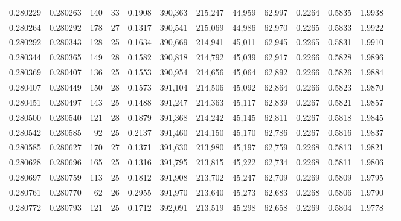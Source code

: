 \begin{tabular}{rrrrrrrrrrrrr}
0.280229 & 0.280263 &   140 &  33 &                                     0.1908 & 390,363 & 215,247 &  44,959 &  62,997 & 0.2264 & 0.5835 & 1.9938 \\
0.280264 & 0.280292 &   178 &  27 &                                     0.1317 & 390,541 & 215,069 &  44,986 &  62,970 & 0.2265 & 0.5833 & 1.9922 \\
0.280292 & 0.280343 &   128 &  25 &                                     0.1634 & 390,669 & 214,941 &  45,011 &  62,945 & 0.2265 & 0.5831 & 1.9910 \\
0.280344 & 0.280365 &   149 &  28 &                                     0.1582 & 390,818 & 214,792 &  45,039 &  62,917 & 0.2266 & 0.5828 & 1.9896 \\
0.280369 & 0.280407 &   136 &  25 &                                     0.1553 & 390,954 & 214,656 &  45,064 &  62,892 & 0.2266 & 0.5826 & 1.9884 \\
0.280407 & 0.280449 &   150 &  28 &                                     0.1573 & 391,104 & 214,506 &  45,092 &  62,864 & 0.2266 & 0.5823 & 1.9870 \\
0.280451 & 0.280497 &   143 &  25 &                                     0.1488 & 391,247 & 214,363 &  45,117 &  62,839 & 0.2267 & 0.5821 & 1.9857 \\
0.280500 & 0.280540 &   121 &  28 &                                     0.1879 & 391,368 & 214,242 &  45,145 &  62,811 & 0.2267 & 0.5818 & 1.9845 \\
0.280542 & 0.280585 &    92 &  25 &                                     0.2137 & 391,460 & 214,150 &  45,170 &  62,786 & 0.2267 & 0.5816 & 1.9837 \\
0.280585 & 0.280627 &   170 &  27 &                                     0.1371 & 391,630 & 213,980 &  45,197 &  62,759 & 0.2268 & 0.5813 & 1.9821 \\
0.280628 & 0.280696 &   165 &  25 &                                     0.1316 & 391,795 & 213,815 &  45,222 &  62,734 & 0.2268 & 0.5811 & 1.9806 \\
0.280697 & 0.280759 &   113 &  25 &                                     0.1812 & 391,908 & 213,702 &  45,247 &  62,709 & 0.2269 & 0.5809 & 1.9795 \\
0.280761 & 0.280770 &    62 &  26 &                                     0.2955 & 391,970 & 213,640 &  45,273 &  62,683 & 0.2268 & 0.5806 & 1.9790 \\
0.280772 & 0.280793 &   121 &  25 &                                     0.1712 & 392,091 & 213,519 &  45,298 &  62,658 & 0.2269 & 0.5804 & 1.9778 \\

\end{tabular}

